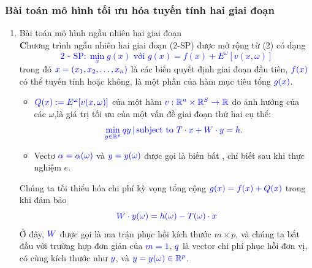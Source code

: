 \documentclass[a4paper]{article}
\begin{document}
\subsubsection{Bài toán mô hình tối ưu hóa tuyến tính hai giai đoạn}
\begin{enumerate}
    \item Bài toán mô hình ngẫu nhiên hai giai đoạn\\
    \textbf Chương trình ngẫu nhiên hai giai đoạn (2-SP) được mở rộng từ (2) có dạng
 \textcolor{blue}{$$\text{2 - SP}: \min_x g(x) \text{ với } g(x) = f(x) + E^\omega[v(x, \omega)] $$}
trong đó \(\textcolor{blue}{ x = (x_1, x_2, \ldots, x_n)} \) là các biến quyết định giai đoạn đầu tiên,
\( \textcolor{blue}{f(x)} \) có thể tuyến tính hoặc không, là một phần của hàm mục tiêu tổng \(\textcolor{blue}{g(x)} \).
\begin{itemize}
    \item  \( \textcolor{blue}{Q(x) := E^\omega[v(x, \omega)]} \) của một hàm
    \( \textcolor{blue}{v : \mathbb{R}^n \times \mathbb{R}^S \rightarrow \mathbb{R} }\)
    do ảnh hưởng của các  \( \omega \),là giá trị tối ưu của một vấn đề giai đoạn thứ hai cụ thể:
    \[ \textcolor{blue}{\min_{y \in \mathbb{R}^p} qy \, | \, \text{subject to } T \cdot x + W \cdot y = h. } \]
    \item Vectơ \( \textcolor{blue}{\alpha = \alpha(\omega) }\) và \( \textcolor{blue}{y = y(\omega)} \) được gọi là biến bất , chỉ biết sau khi thực nghiệm \( e \).
\end{itemize}
Chúng ta tối thiểu hóa chi phí kỳ vọng tổng cộng \(\textcolor{blue}{ g(x) = f(x) + Q(x)} \) trong khi đảm bảo
\[\textcolor{blue}{ W \cdot y(\omega) = h(\omega) - T(\omega) \cdot x }\]
Ở đây, \( \textcolor{blue}{W} \) được gọi là ma trận phục hồi kích thước \( m \times p \), và chúng ta bắt đầu với trường hợp đơn giản của \( \textcolor{blue}{m = 1} \),
\( \textcolor{blue}{q }\) là vector chi phí phục hồi đơn vị, có cùng kích thước như \(\textcolor{blue}{ y }\), và \( \textcolor{blue}{y = y(\omega) \in \mathbb{R}^p} \).


\end{enumerate}
\end{document}
